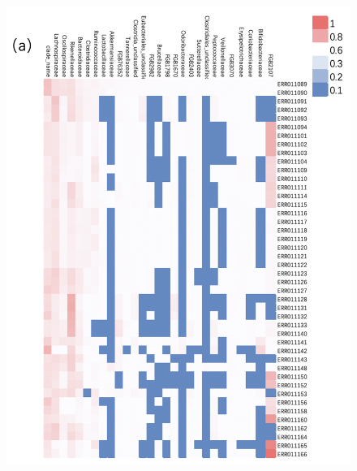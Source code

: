 \documentclass[12pt]{article}
\begin{document}
\begin{figure}[H]
    \centering
    \includegraphics[width=1\linewidth]{pic/heatingmapfamily.png}
\end{figure}
\newpage
\end{document}
